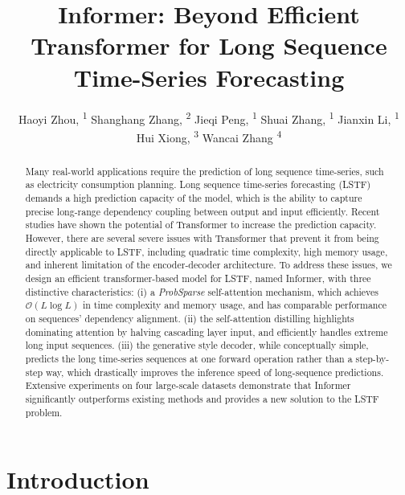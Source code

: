 \documentclass[letterpaper]{article} %
\title{Informer: Beyond Efficient Transformer for Long Sequence \\ Time-Series Forecasting}
\author{
    Haoyi Zhou, \textsuperscript{\rm 1}
    Shanghang Zhang, \textsuperscript{\rm 2}
    Jieqi Peng, \textsuperscript{\rm 1}
    Shuai Zhang, \textsuperscript{\rm 1}
    Jianxin Li, \textsuperscript{\rm 1} \\
    Hui Xiong, \textsuperscript{\rm 3}
    Wancai Zhang \textsuperscript{\rm 4} \\
}
\newcommand{\bigO}{\mathcal{O}}
\begin{document}
\maketitle

\begin{abstract}

Many real-world applications require the prediction of long sequence time-series, such as electricity consumption planning. Long sequence time-series forecasting (LSTF) demands a high prediction capacity of the model, which is the ability to capture precise long-range dependency coupling between output and input efficiently. Recent studies have shown the potential of Transformer to increase the prediction capacity. However, there are several severe issues with Transformer that prevent it from being directly applicable to LSTF, including quadratic time complexity, high memory usage, and inherent limitation of the encoder-decoder architecture. 
To address these issues, we design an efficient transformer-based model for LSTF, named Informer, with three distinctive characteristics: (i) a \emph{ProbSparse} self-attention mechanism, which achieves $\bigO(L \log L)$ in time complexity and memory usage, and has comparable performance on sequences' dependency alignment. (ii) the self-attention distilling highlights dominating attention by halving cascading layer input, and efficiently handles extreme long input sequences. (iii) the generative style decoder, while conceptually simple, predicts the long time-series sequences at one forward operation rather than a step-by-step way, which drastically improves the inference speed of long-sequence predictions. Extensive experiments on four large-scale datasets demonstrate that Informer significantly outperforms existing methods and provides a new solution to the LSTF problem.

\end{abstract}

\section{Introduction}
\end{document}
